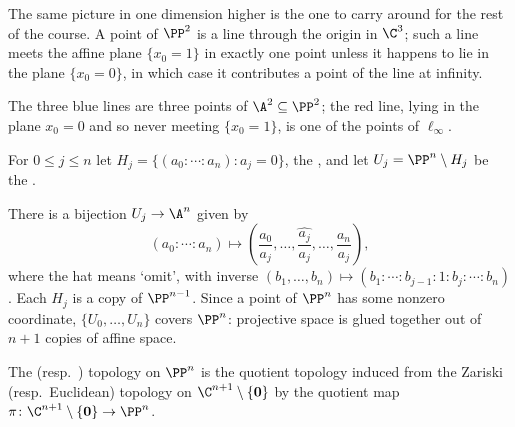 The same picture in one dimension higher is the one to carry around for the rest of the course. A point of $\PP^2$ is a line through the origin in $\C^3$; such a line meets the affine plane $\{x_0 = 1\}$ in exactly one point unless it happens to lie in the plane $\{x_0 = 0\}$, in which case it contributes a point of the line at infinity.

\begin{center}
\end{center}

The three blue lines are three points of $\A^2 \subseteq \PP^2$; the red line, lying in the plane $x_0 = 0$ and so never meeting $\{x_0=1\}$, is one of the points of $\ell_\infty$.

\begin{definition}
	For $0 \leq j \leq n$ let $H_j = \{(a_0:\cdots:a_n) : a_j = 0\}$, the , and let $U_j = \PP^n \setminus H_j$ be the .
\end{definition}

There is a bijection $U_j \to \A^n$ given by
$$(a_0 : \cdots : a_n) \longmapsto \left(\frac{a_0}{a_j},\dots,\widehat{\frac{a_j}{a_j}},\dots,\frac{a_n}{a_j}\right),$$
where the hat means `omit', with inverse $(b_1,\dots,b_n) \mapsto (b_1 : \cdots : b_{j-1} : 1 : b_j : \cdots : b_n)$. Each $H_j$ is a copy of $\PP^{n-1}$. Since a point of $\PP^n$ has some nonzero coordinate, $\{U_0,\dots,U_n\}$ covers $\PP^n$: projective space is glued together out of $n+1$ copies of affine space.

\begin{definition}
	The  (resp.\ ) topology on $\PP^n$ is the quotient topology induced from the Zariski (resp.\ Euclidean) topology on $\C^{n+1}\setminus\{\mathbf{0}\}$ by the quotient map $\pi \colon \C^{n+1}\setminus\{\mathbf 0\} \to \PP^n$.
\end{definition}

